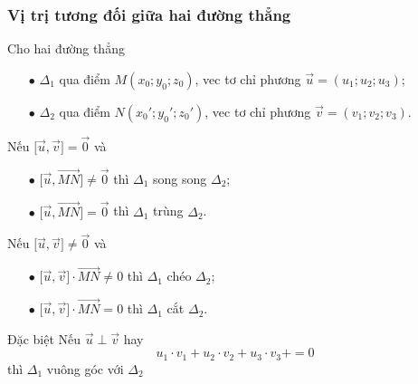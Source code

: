 \subsubsection{Vị trị tương đối giữa hai đường thẳng}
Cho hai đường thẳng 
\begin{itemize}
	\item [$\bullet$] $\Delta_1$ qua điểm $M(x_0;y_0;z_0)$, vec tơ chỉ phương $\vec{u}=(u_1;u_2;u_3)$;
	\item [$\bullet$] $\Delta_2$ qua điểm $N(x_0';y_0';z_0')$, vec tơ chỉ phương $\vec{v}=(v_1;v_2;v_3)$.
\end{itemize}
\begin{tcolorbox}[colframe=cyan,colback=red!3!white,boxrule=0.5mm]
\begin{minipage}[b]{9cm}
	\begin{listEX}[1]
		\item []  Nếu $\bigg[\vec{u},\vec{v}\bigg] = \vec{0}$ và 
		\begin{itemize}
			\item [$\bullet$] $\bigg[\vec{u},\vec{MN}\bigg]\ne \vec{0}$  thì $\Delta_1$ song song $\Delta_2$; 
			\item [$\bullet$] $\bigg[\vec{u},\vec{MN}\bigg]  =\vec{0}$  thì $\Delta_1$ trùng $\Delta_2$.
		\end{itemize}
		\item []  Nếu $\bigg[\vec{u},\vec{v}\bigg] \ne \vec{0}$ và 
		\begin{itemize}
			\item [$\bullet$] $\bigg[\vec{u},\vec{v}\bigg] \cdot \vec{MN} \ne 0$  thì $\Delta_1$ chéo $\Delta_2$; 
			\item [$\bullet$] $\bigg[\vec{u},\vec{v}\bigg] \cdot \vec{MN} =0$  thì $\Delta_1$ cắt $\Delta_2$.
		\end{itemize}
	\end{listEX}
\end{minipage}\hspace{1cm}
\begin{minipage}[b]{6cm}
	\begin{khung4}{Đặc biệt}
		\vskip 0.2cm
		Nếu $\vec{u} \perp \vec{v}$ hay
		$$u_1 \cdot v_1 +u_2 \cdot v_2+  u_3 \cdot v_3  +  =0 $$
		thì $\Delta_1$ vuông góc với $\Delta_2$		
		\vskip 0.2cm
	\end{khung4}
	\vspace{1.5cm}
\end{minipage}
\end{tcolorbox}
